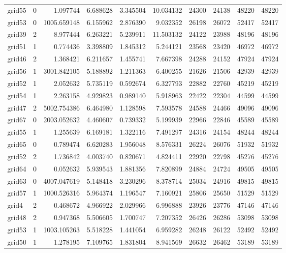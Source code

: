 \begin{longtable}{|l|r|r|r|r|r|r|r|r|r|}
grid55 & 0 & 1.097744 & 6.688628 & 3.345504 & 10.034132 & 24300 & 24138 & 48220 & 48220 \\
grid53 & 0 & 1005.659148 & 6.155962 & 2.876390 & 9.032352 & 26198 & 26072 & 52417 & 52417 \\
grid39 & 2 & 8.977444 & 6.263221 & 5.239911 & 11.503132 & 24122 & 23988 & 48196 & 48196 \\
grid51 & 1 & 0.774436 & 3.398809 & 1.845312 & 5.244121 & 23568 & 23420 & 46972 & 46972 \\
grid46 & 2 & 1.368421 & 6.211657 & 1.455741 & 7.667398 & 24288 & 24152 & 47924 & 47924 \\
grid56 & 1 & 3001.842105 & 5.188892 & 1.211363 & 6.400255 & 21626 & 21506 & 42939 & 42939 \\
grid52 & 1 & 2.052632 & 5.735119 & 0.592674 & 6.327793 & 22882 & 22760 & 45219 & 45219 \\
grid54 & 1 & 2.263158 & 4.929823 & 0.989140 & 5.918963 & 22422 & 22304 & 44599 & 44599 \\
grid47 & 2 & 5002.754386 & 6.464980 & 1.128598 & 7.593578 & 24588 & 24466 & 49096 & 49096 \\
grid67 & 0 & 2003.052632 & 4.460607 & 0.739332 & 5.199939 & 22966 & 22846 & 45589 & 45589 \\
grid55 & 1 & 1.255639 & 6.169181 & 1.322116 & 7.491297 & 24316 & 24154 & 48244 & 48244 \\
grid65 & 0 & 0.789474 & 6.620283 & 1.956048 & 8.576331 & 26224 & 26076 & 51932 & 51932 \\
grid52 & 2 & 1.736842 & 4.003740 & 0.820671 & 4.824411 & 22920 & 22798 & 45276 & 45276 \\
grid64 & 0 & 0.052632 & 5.939543 & 1.881356 & 7.820899 & 24884 & 24724 & 49505 & 49505 \\
grid63 & 0 & 4007.047619 & 5.148418 & 3.230296 & 8.378714 & 25034 & 24916 & 49815 & 49815 \\
grid57 & 1 & 1000.526316 & 5.964374 & 1.196547 & 7.160921 & 25806 & 25650 & 51529 & 51529 \\
grid4 & 2 & 0.468672 & 4.966922 & 2.029966 & 6.996888 & 23926 & 23776 & 47146 & 47146 \\
grid48 & 2 & 0.947368 & 5.506605 & 1.700747 & 7.207352 & 26426 & 26286 & 53098 & 53098 \\
grid53 & 1 & 1003.105263 & 5.518228 & 1.441054 & 6.959282 & 26248 & 26122 & 52492 & 52492 \\
grid50 & 1 & 1.278195 & 7.109765 & 1.831804 & 8.941569 & 26632 & 26462 & 53189 & 53189 \\

\end{longtable}
